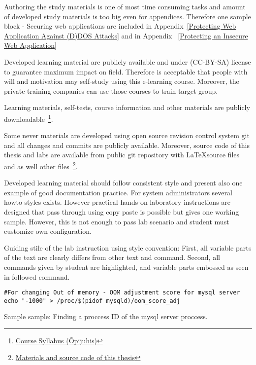 Authoring the study materials is one of most time consuming tasks and amount of developed study materials is too big even for appendices. Therefore one sample block - Securing web applications are included in Appendix~\ref{Protecting Web Application Against (D)DOS Attacks} and in Appendix~ \ref{Protecting an Insecure Web Application} 

Developed learning material are publicly available and under (\gls{CC-BY-SA}) license to guarantee maximum impact on field. Therefore is acceptable that people with will and motivation may self-study using this e-learning course. Moreover, the private training companies can use those courses to train target group.

Learning materials, self-tests, course information and other materials are publicly downloadable~\footnote{\href{http://elab.itcollege.ee:8000/cyber-course/}{Course Syllabus (Õpijuhis)}}.


Some never materials are developed using open source revision control system \gls{git} and all changes and commits are publicly available. Moreover, source code of this thesis and labs are available from public \gls{git} repository with \LaTeX  source files and as well other files~\footnote{\href{https://github.com/magavdraakon/margus-thesis.git}{Materials and source code of this thesis}}.


Developed learning material should follow consistent style and present also one example of good documentation practice. For system administrators several howto styles exists. However practical hands-on laboratory instructions are designed that pass through using copy paste is possible but gives one working sample. However, this is not enough to pass lab scenario and student must customize own configuration.

Guiding stile of the lab instruction using style convention: First, all variable parts of the text are clearly differs from other text and command. Second, all commands given by student are highlighted, and variable parts embossed as seen in followed command.


\begin{verbatim}
#For changing Out of memory - OOM adjustment score for mysql server
echo "-1000" > /proc/$(pidof mysqld)/oom_score_adj
\end{verbatim}



Sample sample: Finding a proccess ID of the mysql server proccess.

